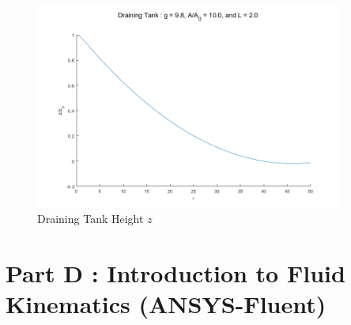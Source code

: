 \documentclass{article}
\begin{document}
\begin{figure}[h!]
	\centering
	\includegraphics[width=0.90\textwidth]{./matlab/drainingTank_Height.png}
	\caption{Draining Tank Height $z$}
	\label{img:drainingTankHeight}
\end{figure}


\section{Part D : Introduction to Fluid Kinematics (ANSYS-Fluent) \cite{ANSYSmodelWing}}



\printbibliography[title={References}]
\end{document}
